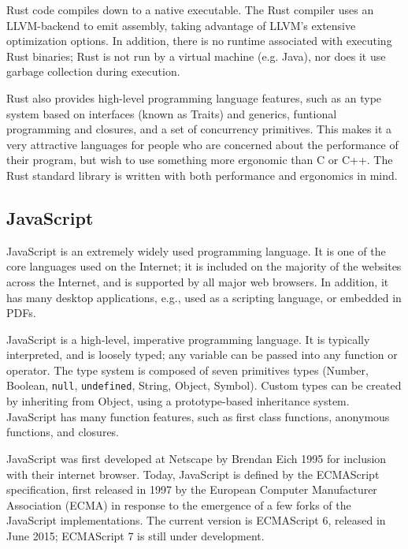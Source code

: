 \documentclass{article}
\begin{document}
\begin{multicols}{2}
Rust code compiles down to a native executable. The Rust compiler uses an
LLVM-backend to emit assembly, taking advantage of LLVM's extensive optimization
options. In addition, there is no runtime associated with executing Rust
binaries; Rust is not run by a virtual machine (e.g. Java), nor does it use
garbage collection during execution. \newline

Rust also provides high-level programming language features, such as an type
system based on interfaces (known as Traits) and generics, funtional programming
and closures, and a set of concurrency primitives. This makes it a very
attractive languages for people who are concerned about the performance of their
program, but wish to use something more ergonomic than C or C++. The Rust
standard library is written with both performance and ergonomics in mind.

\subsection{JavaScript}

JavaScript is an extremely widely used programming language. It is one of the
core languages used on the Internet; it is included on the majority of the
websites across the Internet, and is supported by all major web browsers. In
addition, it has many desktop applications, e.g., used as a scripting
language, or embedded in PDFs. \newline

JavaScript is a high-level, imperative programming language. It is typically
interpreted, and is loosely typed; any variable can be passed into any function
or operator. The type system is composed of seven primitives types (Number,
Boolean, \texttt{null}, \texttt{undefined}, String, Object, Symbol). Custom
types can be created by inheriting from Object, using a prototype-based
inheritance system. JavaScript has many function features, such as first class
functions, anonymous functions, and closures. \newline

JavaScript was first developed at Netscape by Brendan Eich 1995 for inclusion
with their internet browser. Today, JavaScript is defined by the ECMAScript
specification, first released in 1997 by the European Computer Manufacturer
Association (ECMA) in response to the emergence of a few forks of the JavaScript
implementations. The current version is ECMAScript 6, released in June 2015;
ECMAScript 7 is still under development.\newline


\end{multicols}
\end{document}
